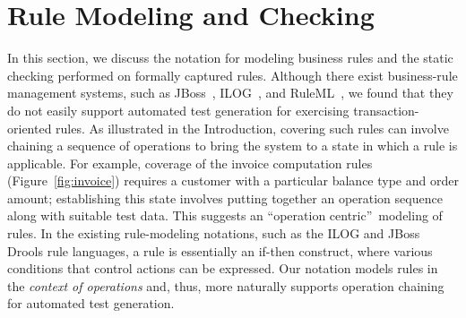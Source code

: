 
\newcommand{\term}{\textit}
\newcommand{\lit}{\texttt}

\section{Rule Modeling and Checking}
\label{sec:model}

In this section, we discuss the notation for modeling business rules and the
static checking performed on formally captured rules. Although there exist
business-rule management systems, such as JBoss~\cite{JBoss}, ILOG~\cite{ILog},
and RuleML~\cite{RuleML}, we found that they do not easily support automated
test generation for exercising transaction-oriented rules. As illustrated in the
Introduction, covering such rules can involve chaining a sequence of operations
to bring the system to a state in which a rule is applicable. For example,
coverage of the invoice computation rules (Figure~\ref{fig:invoice}) requires a
customer with a particular balance type and order amount; establishing this
state involves putting together an operation sequence along with suitable test
data. This suggests an ``operation centric''~modeling of rules. In the existing
rule-modeling notations, such as the ILOG and JBoss Drools rule languages, a
rule is essentially an if-then construct, where various conditions that control
actions can be expressed. Our notation models rules in the \textit{context of
  operations} and, thus, more naturally supports operation chaining for
automated test generation.


